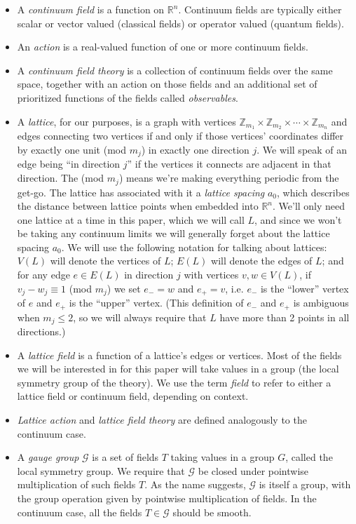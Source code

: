 \documentclass[9pt,twocolumn,twoside]{article}
\begin{document}
\begin{itemize}
\item A \textit{continuum field} is a function on $\mathbb{R}^n$.  Continuum fields are typically either scalar or vector valued (classical fields) or operator valued (quantum fields).
\item An \textit{action} is a real-valued function of one or more continuum fields.
\item A \textit{continuum field theory} is a collection of continuum fields over the same space, together with an action on those fields and an additional set of prioritized functions of the fields called \textit{observables}.
\item A \textit{lattice}, for our purposes, is a graph with vertices $\mathbb{Z}_{m_1}\times\mathbb{Z}_{m_2}\times \cdots \times \mathbb{Z}_{m_n}$ and edges connecting two vertices if and only if those vertices' coordinates differ by exactly one unit (mod $m_j$) in exactly one direction $j$.  We will speak of an edge being ``in direction $j$'' if the vertices it connects are adjacent in that direction.  The (mod $m_j$) means we're making everything periodic from the get-go.  The lattice has associated with it a \textit{lattice spacing} $a_0$, which describes the distance between lattice points when embedded into $\mathbb{R}^n$.  We'll only need one lattice at a time in this paper, which we will call $L$, and since we won't be taking any continuum limits we will generally forget about the lattice spacing $a_0$.  We will use the following notation for talking about lattices: $V(L)$ will denote the vertices of $L$; $E(L)$ will denote the edges of $L$; and for any edge $e\in E(L)$ in direction $j$ with vertices $v,w\in V(L)$, if $v_j-w_j\equiv 1$ (mod $m_j$) we set $e_- = w$ and $e_+ = v$, i.e. $e_-$ is the ``lower'' vertex of $e$ and $e_+$ is the ``upper'' vertex.  (This definition of $e_-$ and $e_+$ is ambiguous when $m_j\leq 2$, so we will always require that $L$ have more than 2 points in all directions.)
\item A \textit{lattice field} is a function of a lattice's edges or vertices.  Most of the fields we will be interested in for this paper will take values in a group (the local symmetry group of the theory).  We use the term \textit{field} to refer to either a lattice field or continuum field, depending on context.
\item \textit{Lattice action} and \textit{lattice field theory} are defined analogously to the continuum case. 
\item A \textit{gauge group} $\mathcal{G}$ is a set of fields $T$ taking values in a group $G$, called the local symmetry group.  We require that $\mathcal{G}$ be closed under pointwise multiplication of such fields $T$.  As the name suggests, $\mathcal{G}$ is itself a group, with the group operation given by pointwise multiplication of fields.  In the continuum case, all the fields $T\in\mathcal{G}$ should be smooth.

\end{itemize}
\end{document}
